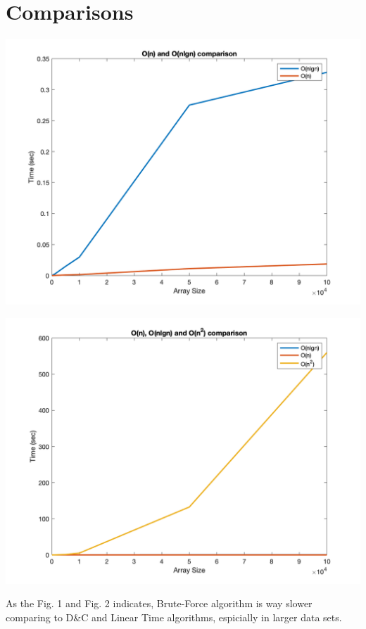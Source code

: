 \documentclass[twocolumns]{IEEEtran}
\begin{document}
\section{Comparisons}
\begin{center}
	\includegraphics[scale=0.22]{n_nlgn.png}\label{n}
	
	\includegraphics[scale=.22]{n_nlgn_n2.png}\label{n2}
\end{center}
As the Fig. 1 and Fig. 2 indicates, Brute-Force algorithm is way slower comparing to D\&C and Linear Time algorithms, espicially in larger data sets. 
\end{document}
